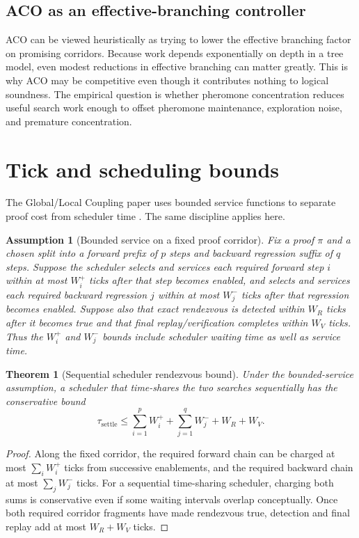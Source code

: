\documentclass[11pt]{article}
\newtheorem{theorem}[definition]{Theorem}
\newtheorem{assumption}[definition]{Assumption}
\begin{document}
\subsection{ACO as an effective-branching controller}
ACO can be viewed heuristically as trying to lower the effective branching factor on promising corridors. Because work depends exponentially on depth in a tree model, even modest reductions in effective branching can matter greatly. This is why ACO may be competitive even though it contributes nothing to logical soundness. The empirical question is whether pheromone concentration reduces useful search work enough to offset pheromone maintenance, exploration noise, and premature concentration.

\section{Tick and scheduling bounds}

The Global/Local Coupling paper uses bounded service functions to separate proof cost from scheduler time \cite{GLC}. The same discipline applies here.

\begin{assumption}[Bounded service on a fixed proof corridor]
Fix a proof $\pi$ and a chosen split into a forward prefix of $p$ steps and backward regression suffix of $q$ steps. Suppose the scheduler selects and services each required forward step $i$ within at most $W_i^+$ ticks after that step becomes enabled, and selects and services each required backward regression $j$ within at most $W_j^-$ ticks after that regression becomes enabled. Suppose also that exact rendezvous is detected within $W_R$ ticks after it becomes true and that final replay/verification completes within $W_V$ ticks. Thus the $W_i^+$ and $W_j^-$ bounds include scheduler waiting time as well as service time.
\end{assumption}

\begin{theorem}[Sequential scheduler rendezvous bound]
Under the bounded-service assumption, a scheduler that time-shares the two searches sequentially has the conservative bound
\[
\tau_{\mathrm{settle}}
\le
\sum_{i=1}^{p}W_i^+
+
\sum_{j=1}^{q}W_j^-
+W_R+W_V.
\]
\end{theorem}

\begin{proof}
Along the fixed corridor, the required forward chain can be charged at most $\sum_i W_i^+$ ticks from successive enablements, and the required backward chain at most $\sum_j W_j^-$ ticks. For a sequential time-sharing scheduler, charging both sums is conservative even if some waiting intervals overlap conceptually. Once both required corridor fragments have made rendezvous true, detection and final replay add at most $W_R+W_V$ ticks.
\end{proof}
\end{document}
